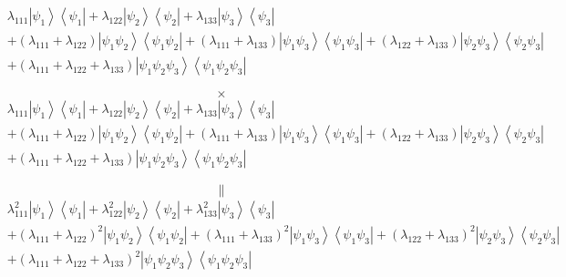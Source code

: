 \documentclass[aps,preprint]{revtex4}%
\begin{document}
\begin{align}
& \lambda_{111}\left\vert \psi_{1}\right\rangle \left\langle \psi
_{1}\right\vert +\lambda_{122}\left\vert \psi_{2}\right\rangle \left\langle
\psi_{2}\right\vert +\lambda_{133}\left\vert \psi_{3}\right\rangle
\left\langle \psi_{3}\right\vert \nonumber\\
& +\left(  \lambda_{111}+\lambda_{122}\right)  \left\vert \psi_{1}\psi
_{2}\right\rangle \left\langle \psi_{1}\psi_{2}\right\vert +\left(
\lambda_{111}+\lambda_{133}\right)  \left\vert \psi_{1}\psi_{3}\right\rangle
\left\langle \psi_{1}\psi_{3}\right\vert +\left(  \lambda_{122}+\lambda
_{133}\right)  \left\vert \psi_{2}\psi_{3}\right\rangle \left\langle \psi
_{2}\psi_{3}\right\vert \nonumber\\
& +\left(  \lambda_{111}+\lambda_{122}+\lambda_{133}\right)  \left\vert
\psi_{1}\psi_{2}\psi_{3}\right\rangle \left\langle \psi_{1}\psi_{2}\psi
_{3}\right\vert
\end{align}
%

\[
\times
\]%
\begin{align}
& \lambda_{111}\left\vert \psi_{1}\right\rangle \left\langle \psi
_{1}\right\vert +\lambda_{122}\left\vert \psi_{2}\right\rangle \left\langle
\psi_{2}\right\vert +\lambda_{133}\left\vert \psi_{3}\right\rangle
\left\langle \psi_{3}\right\vert \nonumber\\
& +\left(  \lambda_{111}+\lambda_{122}\right)  \left\vert \psi_{1}\psi
_{2}\right\rangle \left\langle \psi_{1}\psi_{2}\right\vert +\left(
\lambda_{111}+\lambda_{133}\right)  \left\vert \psi_{1}\psi_{3}\right\rangle
\left\langle \psi_{1}\psi_{3}\right\vert +\left(  \lambda_{122}+\lambda
_{133}\right)  \left\vert \psi_{2}\psi_{3}\right\rangle \left\langle \psi
_{2}\psi_{3}\right\vert \nonumber\\
& +\left(  \lambda_{111}+\lambda_{122}+\lambda_{133}\right)  \left\vert
\psi_{1}\psi_{2}\psi_{3}\right\rangle \left\langle \psi_{1}\psi_{2}\psi
_{3}\right\vert
\end{align}
%

\[
\parallel
\]%
\begin{align}
& \lambda_{111}^{2}\left\vert \psi_{1}\right\rangle \left\langle \psi
_{1}\right\vert +\lambda_{122}^{2}\left\vert \psi_{2}\right\rangle
\left\langle \psi_{2}\right\vert +\lambda_{133}^{2}\left\vert \psi
_{3}\right\rangle \left\langle \psi_{3}\right\vert \nonumber\\
& +\left(  \lambda_{111}+\lambda_{122}\right)  ^{2}\left\vert \psi_{1}\psi
_{2}\right\rangle \left\langle \psi_{1}\psi_{2}\right\vert +\left(
\lambda_{111}+\lambda_{133}\right)  ^{2}\left\vert \psi_{1}\psi_{3}%
\right\rangle \left\langle \psi_{1}\psi_{3}\right\vert +\left(  \lambda
_{122}+\lambda_{133}\right)  ^{2}\left\vert \psi_{2}\psi_{3}\right\rangle
\left\langle \psi_{2}\psi_{3}\right\vert \nonumber\\
& +\left(  \lambda_{111}+\lambda_{122}+\lambda_{133}\right)  ^{2}\left\vert
\psi_{1}\psi_{2}\psi_{3}\right\rangle \left\langle \psi_{1}\psi_{2}\psi
_{3}\right\vert
\end{align}
\end{document}
